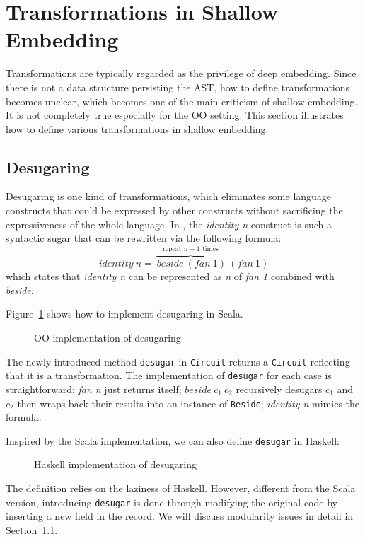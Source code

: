 \section{Transformations in Shallow Embedding}
Transformations are typically regarded as the privilege of deep embedding.
Since there is not a data structure persisting the AST, how to define transformations
becomes unclear, which becomes one of the main criticism of shallow embedding.
It is not completely true especially for the OO setting.
This section illustrates how to define various transformations in shallow embedding.

\subsection{Desugaring}
Desugaring is one kind of transformations, which eliminates some
language constructs that could be expressed by other constructs without
sacrificing the expressiveness of the whole language.
In \dsl, the \emph{identity n} construct is such a syntactic sugar that can
be rewritten via the following formula:
$$identity\ n = \overbrace{\ beside\ (fan\ 1)}^{\text{repeat }n-1\text{ times}}\ (fan\ 1)$$
which states that \emph{identity n} can be represented as \emph{n} of \emph{fan 1} combined with \emph{beside}.

Figure~\ref{code:desugar} shows how to implement desugaring in Scala.
\begin{figure}
\caption{OO implementation of desugaring}
\label{code:desugar}
\end{figure}
The newly introduced method \lstinline{desugar} in \lstinline{Circuit} returns a \lstinline{Circuit} reflecting that it is a transformation. The implementation of \lstinline{desugar} for each case is
straightforward: \emph{fan n} just returns itself; $beside\ c_1\ c_2$ recursively desugars $c_1$ and $c_2$ then wraps back
their results into an instance of \lstinline{Beside}; \emph{identity n} mimics the
formula.

Inspired by the Scala implementation, we can also define \lstinline{desugar} in Haskell:

\begin{figure}
\caption{Haskell implementation of desugaring}
\label{code:haskell}
\end{figure}
The definition relies on the laziness of Haskell.
However, different from the Scala version, introducing \lstinline{desugar} is done
through modifying the original code by inserting a new field in the record.
We will discuss modularity issues in detail in Section~\ref{}.

